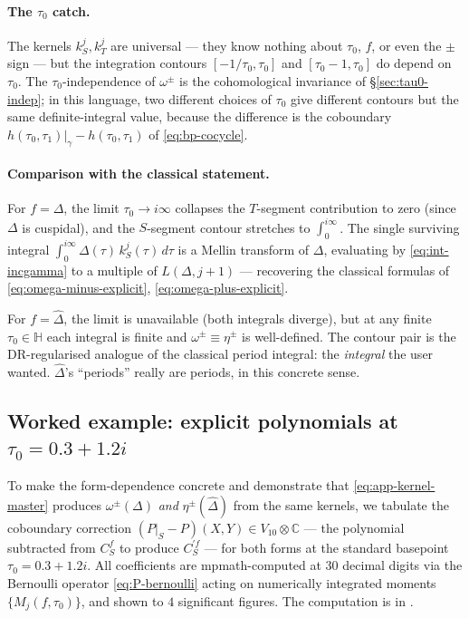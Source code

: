\documentclass[11pt,letterpaper]{article}
\newcommand{\HH}{\mathbb{H}}
\newcommand{\CC}{\mathbb{C}}
\newcommand{\Dhat}{\widehat{\Delta}}
\begin{document}
\paragraph{The $\tau_0$ catch.}
The kernels $k_S^j, k_T^j$ are universal --- they know nothing about
$\tau_0$, $f$, or even the $\pm$ sign --- but the integration contours
$[-1/\tau_0, \tau_0]$ and $[\tau_0 - 1, \tau_0]$ do depend on $\tau_0$.
The $\tau_0$-independence of $\omega^\pm$ is the cohomological invariance
of \S\ref{sec:tau0-indep}; in this language, two different choices of
$\tau_0$ give different contours but the same definite-integral value,
because the difference is the coboundary
\(h(\tau_0,\tau_1)|_\gamma - h(\tau_0,\tau_1)\) of \eqref{eq:bp-cocycle}.

\paragraph{Comparison with the classical statement.}
For $f = \Delta$, the limit $\tau_0 \to i\infty$ collapses the $T$-segment
contribution to zero (since $\Delta$ is cuspidal), and the $S$-segment
contour stretches to $\int_0^{i\infty}$.  The single surviving integral
$\int_0^{i\infty}\Delta(\tau)\,k_S^j(\tau)\,d\tau$ is a Mellin transform
of $\Delta$, evaluating by \eqref{eq:int-incgamma} to a multiple of
$L(\Delta, j+1)$ --- recovering the classical formulas of
\eqref{eq:omega-minus-explicit}, \eqref{eq:omega-plus-explicit}.

For $f = \widehat\Delta$, the limit is unavailable (both integrals
diverge), but at any finite $\tau_0 \in \HH$ each integral is finite and
$\omega^\pm \equiv \eta^\pm$ is well-defined.  The contour pair is the
DR-regularised analogue of the classical period integral: the
\emph{integral} the user wanted.  $\Dhat$'s ``periods'' really are
periods, in this concrete sense.

\subsection{Worked example: explicit polynomials at $\tau_0 = 0.3 + 1.2i$}\label{app:worked-example}

To make the form-dependence concrete and demonstrate that
\eqref{eq:app-kernel-master} produces $\omega^\pm(\Delta)$ \emph{and}
$\eta^\pm(\widehat\Delta)$ from the same kernels, we tabulate the
coboundary correction $(P|_S - P)(X, Y) \in V_{10}\otimes\CC$ --- the
polynomial subtracted from $C^f_S$ to produce $C^{\prime f}_S$ --- for
both forms at the standard basepoint $\tau_0 = 0.3 + 1.2i$.  All
coefficients are mpmath-computed at $30$ decimal digits via the Bernoulli
operator \eqref{eq:P-bernoulli} acting on numerically integrated moments
$\{M_j(f, \tau_0)\}$, and shown to $4$ significant figures.  The
computation is in \cite{NumericScript}.
\end{document}
